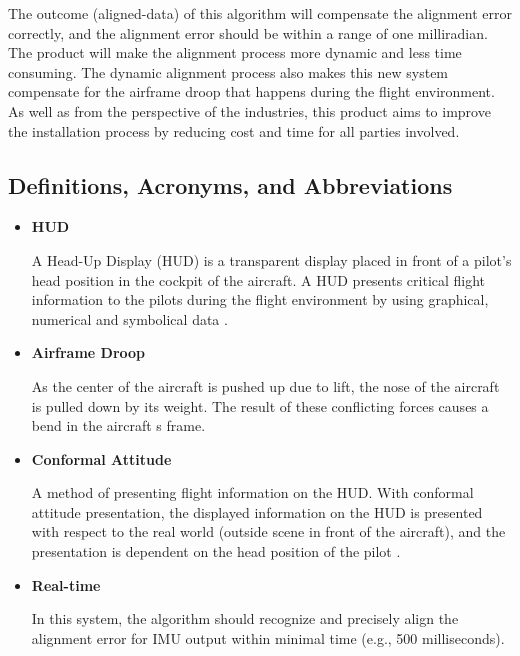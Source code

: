 The outcome (aligned-data) of this algorithm will compensate the alignment error correctly, and the alignment error should be within a range of one milliradian. The product will make the alignment process more dynamic and less time consuming. The dynamic alignment process also makes this new system compensate for the airframe droop that happens during the flight environment. As well as from the perspective of the industries, this product aims to improve the installation process by reducing cost and time for all parties involved.

\subsection{Definitions, Acronyms, and Abbreviations}
\begin{itemize}
	\item \textbf{HUD}
 	\begin{adjustwidth}{2.5em}{0pt}
 	A Head-Up Display (HUD) is a transparent display placed in front of a pilot’s head position in the cockpit of the aircraft. A HUD presents critical flight information to the pilots during the flight environment by using graphical, numerical and symbolical data \cite{hud}.
 	\\
 	\end{adjustwidth}

	\item \textbf{Airframe Droop}
 	\begin{adjustwidth}{2.5em}{0pt}
	As the center of the aircraft is pushed up due to lift, the nose of the aircraft is pulled down by its weight. The result of these conflicting forces causes a bend in the aircraft \textquotesingle s frame.
	\\
 	\end{adjustwidth}

	\item \textbf{Conformal Attitude}
 	\begin{adjustwidth}{2.5em}{0pt}
	A method of presenting flight information on the HUD. With conformal attitude presentation, the displayed information on the HUD is presented with respect to the real world (outside scene in front of the aircraft), and the presentation is dependent on the head position of the pilot \cite{conformal_atti}.
	\\
 	\end{adjustwidth}

 	\item \textbf{Real-time}
 	\begin{adjustwidth}{2.5em}{0pt}
	In this system, the algorithm should recognize and precisely align the alignment error for IMU output within minimal time (e.g., 500 milliseconds).\\
 	\end{adjustwidth}


\end{itemize}
